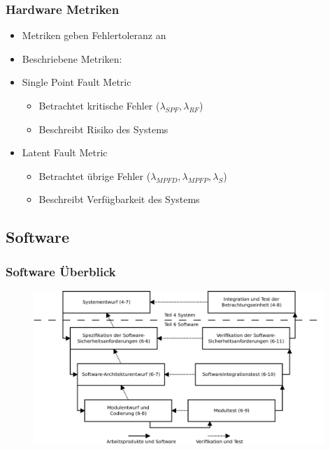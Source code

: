 \documentclass[]{beamer}
\begin{document}
\begin{frame}
\frametitle{Hardware Metriken}

\begin{itemize}
    \item Metriken geben Fehlertoleranz an
    \item Beschriebene Metriken:
    \item Single Point Fault Metric
    \begin{itemize}
        \item Betrachtet kritische Fehler ($ \lambda_{SPF}, \lambda_{RF} $)
        \item Beschreibt Risiko des Systems
    \end{itemize}
    \item Latent Fault Metric
    \begin{itemize}
        \item Betrachtet übrige Fehler ($ \lambda_{MPFD}, \lambda_{MPFP}, \lambda_{S} $)
        \item Beschreibt Verfügbarkeit des Systems
    \end{itemize}
\end{itemize}


\end{frame}




\subsection{Software}

\begin{frame}
\frametitle{Software Überblick}

\begin{figure}
   \includegraphics[width=11cm]{Abb_6_10}
\end{figure}

\end{frame}
\end{document}
